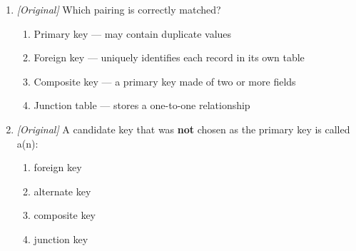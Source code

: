 \begin{enumerate}[label=\textbf{Q\arabic*.}, leftmargin=*]
  the Access file formats?
  \begin{enumerate}[label=\Alph*.]
    \item \texttt{.mdb} is the older format.
    \item \texttt{.accdb} is the newer format.
    \item \texttt{.mdb} is the newer format introduced with Access 2007.
    \item \texttt{.accdb} supports attachment and multi-valued fields.
  \end{enumerate}
\item \textit{[Original]} Which pairing is correctly matched?
  \begin{enumerate}[label=\Alph*.]
    \item Primary key --- may contain duplicate values
    \item Foreign key --- uniquely identifies each record in its own table
    \item Composite key --- a primary key made of two or more fields
    \item Junction table --- stores a one-to-one relationship
  \end{enumerate}
\item \textit{[Original]} A candidate key that was \textbf{not} chosen as the
  primary key is called a(n):
  \begin{enumerate}[label=\Alph*.]
    \item foreign key
    \item alternate key
    \item composite key
    \item junction key
  \end{enumerate}


\end{enumerate}

